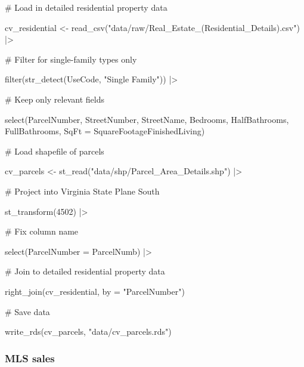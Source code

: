 \documentclass[
  letterpaper,
  DIV=11,
  numbers=noendperiod]{scrartcl}
\newenvironment{Shaded}{\begin{snugshade}}{\end{snugshade}}
\newcommand{\AttributeTok}[1]{\textcolor[rgb]{0.40,0.45,0.13}{#1}}
\newcommand{\CommentTok}[1]{\textcolor[rgb]{0.37,0.37,0.37}{#1}}
\newcommand{\DecValTok}[1]{\textcolor[rgb]{0.68,0.00,0.00}{#1}}
\newcommand{\FunctionTok}[1]{\textcolor[rgb]{0.28,0.35,0.67}{#1}}
\newcommand{\NormalTok}[1]{\textcolor[rgb]{0.00,0.23,0.31}{#1}}
\newcommand{\OtherTok}[1]{\textcolor[rgb]{0.00,0.23,0.31}{#1}}
\newcommand{\SpecialCharTok}[1]{\textcolor[rgb]{0.37,0.37,0.37}{#1}}
\newcommand{\StringTok}[1]{\textcolor[rgb]{0.13,0.47,0.30}{#1}}
\begin{document}
\begin{Shaded}
\begin{Highlighting}[]
\CommentTok{\# Load in detailed residential property data}

\NormalTok{cv\_residential }\OtherTok{\textless{}{-}} \FunctionTok{read\_csv}\NormalTok{(}\StringTok{"data/raw/Real\_Estate\_(Residential\_Details).csv"}\NormalTok{) }\SpecialCharTok{|\textgreater{}} 
  
  \CommentTok{\# Filter for single{-}family types only}
  
  \FunctionTok{filter}\NormalTok{(}\FunctionTok{str\_detect}\NormalTok{(UseCode, }\StringTok{"Single Family"}\NormalTok{)) }\SpecialCharTok{|\textgreater{}} 
  
  \CommentTok{\# Keep only relevant fields}
  
  \FunctionTok{select}\NormalTok{(ParcelNumber, StreetNumber, StreetName, Bedrooms, HalfBathrooms,}
\NormalTok{         FullBathrooms, }\AttributeTok{SqFt =}\NormalTok{ SquareFootageFinishedLiving)}

\CommentTok{\# Load shapefile of parcels}

\NormalTok{cv\_parcels }\OtherTok{\textless{}{-}} \FunctionTok{st\_read}\NormalTok{(}\StringTok{"data/shp/Parcel\_Area\_Details.shp"}\NormalTok{) }\SpecialCharTok{|\textgreater{}} 
  
  \CommentTok{\# Project into Virginia State Plane South}
  
  \FunctionTok{st\_transform}\NormalTok{(}\DecValTok{4502}\NormalTok{) }\SpecialCharTok{|\textgreater{}} 
  
  \CommentTok{\# Fix column name}
  
  \FunctionTok{select}\NormalTok{(}\AttributeTok{ParcelNumber =}\NormalTok{ ParcelNumb) }\SpecialCharTok{|\textgreater{}} 
  
  \CommentTok{\# Join to detailed residential property data}
  
  \FunctionTok{right\_join}\NormalTok{(cv\_residential, }\AttributeTok{by =} \StringTok{"ParcelNumber"}\NormalTok{)}

\CommentTok{\# Save data}

\FunctionTok{write\_rds}\NormalTok{(cv\_parcels, }\StringTok{"data/cv\_parcels.rds"}\NormalTok{)}
\end{Highlighting}
\end{Shaded}

\hypertarget{mls-sales}{%
\subsubsection{MLS sales}\label{mls-sales}}
\end{document}

